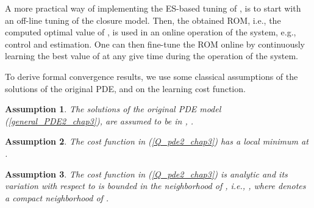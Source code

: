 \documentclass[letterpaper,conference,onecolumn,11pt]{IEEEtran}
\newtheorem{assumption}{Assumption}
\begin{document}
A more practical way of implementing the ES-based tuning of
, is to start with an off-line tuning of the closure
model. Then, the obtained ROM, i.e., the computed optimal value of
, is used in an online operation of the system, e.g.,
control and estimation. One can then fine-tune the ROM online by
continuously learning the best value of  at any give time
during the operation of the system.

To derive formal convergence results, we use some classical
assumptions of the solutions of the original PDE, and on the learning
cost function.
\begin{assumption}\label{pdestab_assumption1_chap3}
The solutions of the original PDE model
(\ref{general_PDE2_chap3}), are assumed to be in
, .
\end{assumption}
\begin{assumption} \label{robustmesass1_pdestab_chap3}
The cost function  in (\ref{Q_pde2_chap3}) has a local minimum
at .
\end{assumption}
\begin{assumption} \label{robustmesass2_pdestab_chap3}
The cost function  in (\ref{Q_pde2_chap3}) is analytic and its
variation with respect to  is bounded in the neighborhood of
, i.e., , where
 denotes a compact neighborhood of
.
\end{assumption}
\end{document}
